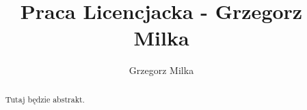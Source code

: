 \documentclass{pracamgr}
\title{Praca Licencjacka - Grzegorz Milka}
\author{Grzegorz Milka}
\begin{document}
\maketitle

\begin{abstract}
Tutaj będzie abstrakt.
\end{abstract}

\tableofcontents





\end{document}
